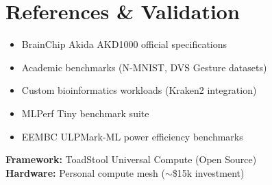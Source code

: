 \documentclass[11pt,a4paper]{article}
\begin{document}
\section{References \& Validation}

\begin{itemize}[leftmargin=*]
    \item BrainChip Akida AKD1000 official specifications
    \item Academic benchmarks (N-MNIST, DVS Gesture datasets)
    \item Custom bioinformatics workloads (Kraken2 integration)
    \item MLPerf Tiny benchmark suite
    \item EEMBC ULPMark-ML power efficiency benchmarks
\end{itemize}

\vspace{1em}
\noindent\hrulefill

\vspace{0.5em}
\noindent\textbf{Framework:} ToadStool Universal Compute (Open Source)\\
\textbf{Hardware:} Personal compute mesh ($\sim$\$15k investment)
\end{document}
